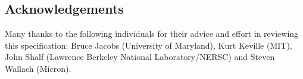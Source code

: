 \documentclass{article}
\begin{document}
\begin{appendices}
	






\newpage
\section*{Acknowledgements}
\label{Acknowledgements}

Many thanks to the following individuals for their advice and 
effort in reviewing this specification: Bruce Jacobs (University 
of Maryland), Kurt Keville (MIT), John Shalf (Lawrence Berkeley 
National Laboratory/NERSC) and Steven Wallach (Micron).

\newpage
{}



%

\end{appendices}
\end{document}
